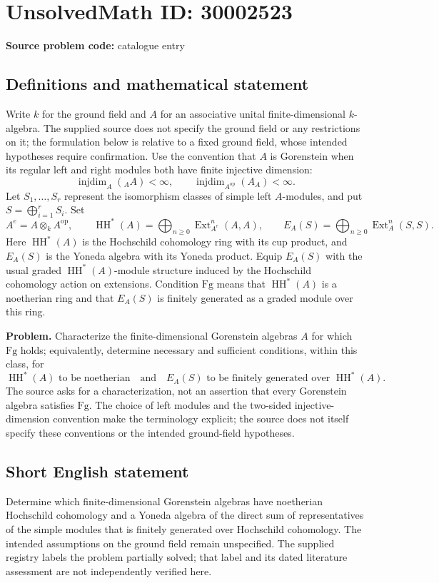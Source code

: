 \documentclass[11pt]{article}
\begin{document}
\section*{UnsolvedMath ID: 30002523}
\textbf{Source problem code:} catalogue entry
\subsection{Definitions and mathematical statement}
Write \(k\) for the ground field and \(A\) for an associative unital finite-dimensional \(k\)-algebra. The supplied source does not specify the ground field or any restrictions on it; the formulation below is relative to a fixed ground field, whose intended hypotheses require confirmation. Use the convention that \(A\) is Gorenstein when its regular left and right modules both have finite injective dimension:
\[
\operatorname{injdim}_A({}_A A)<\infty,
\qquad
\operatorname{injdim}_{A^{\mathrm{op}}}(A_A)<\infty.
\]
Let \(S_1,\ldots,S_r\) represent the isomorphism classes of simple left \(A\)-modules, and put \(S=\bigoplus_{i=1}^r S_i\). Set
\[
A^e=A\otimes_k A^{\mathrm{op}},\qquad
\operatorname{HH}^{*}(A)=\bigoplus_{n\geq 0}\operatorname{Ext}^{n}_{A^e}(A,A),
\qquad
E_A(S)=\bigoplus_{n\geq 0}\operatorname{Ext}^{n}_A(S,S).
\]
Here \(\operatorname{HH}^{*}(A)\) is the Hochschild cohomology ring with its cup product, and \(E_A(S)\) is the Yoneda algebra with its Yoneda product. Equip \(E_A(S)\) with the usual graded \(\operatorname{HH}^{*}(A)\)-module structure induced by the Hochschild cohomology action on extensions. Condition \(\mathrm{Fg}\) means that \(\operatorname{HH}^{*}(A)\) is a noetherian ring and that \(E_A(S)\) is finitely generated as a graded module over this ring.

\textbf{Problem.} Characterize the finite-dimensional Gorenstein algebras \(A\) for which \(\mathrm{Fg}\) holds; equivalently, determine necessary and sufficient conditions, within this class, for
\[
\operatorname{HH}^{*}(A)\text{ to be noetherian}
\quad\text{and}\quad
E_A(S)\text{ to be finitely generated over }\operatorname{HH}^{*}(A).
\]
The source asks for a characterization, not an assertion that every Gorenstein algebra satisfies \(\mathrm{Fg}\). The choice of left modules and the two-sided injective-dimension convention make the terminology explicit; the source does not itself specify these conventions or the intended ground-field hypotheses.
\subsection{Short English statement}
Determine which finite-dimensional Gorenstein algebras have noetherian Hochschild cohomology and a Yoneda algebra of the direct sum of representatives of the simple modules that is finitely generated over Hochschild cohomology. The intended assumptions on the ground field remain unspecified. The supplied registry labels the problem partially solved; that label and its dated literature assessment are not independently verified here.
\end{document}
